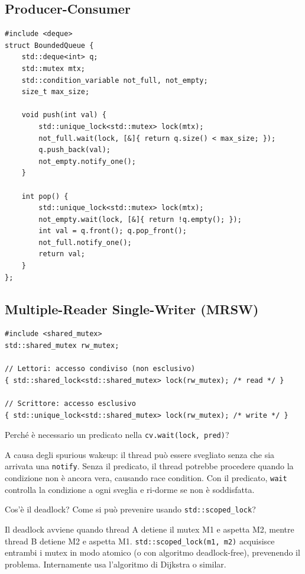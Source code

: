 \documentclass[11pt,a4paper]{article}
\theoremstyle{remark}
\newenvironment{esercizio}[1][]{%
  \begin{tcolorbox}[breakable,title={\textbf{Esercizio / Domanda d'esame}\ifx&#1&\else: #1\fi},
    colback=yellow!5!white, colframe=orange!75!black, fonttitle=\small\bfseries]%
}{%
  \end{tcolorbox}%
}
\newenvironment{risposta}{%
  \begin{tcolorbox}[breakable,title={\textbf{Risposta}},
    colback=green!5!white, colframe=green!50!black, fonttitle=\small\bfseries]%
}{%
  \end{tcolorbox}%
}
\begin{document}
\subsection{Producer-Consumer}

\begin{lstlisting}
#include <deque>
struct BoundedQueue {
    std::deque<int> q;
    std::mutex mtx;
    std::condition_variable not_full, not_empty;
    size_t max_size;

    void push(int val) {
        std::unique_lock<std::mutex> lock(mtx);
        not_full.wait(lock, [&]{ return q.size() < max_size; });
        q.push_back(val);
        not_empty.notify_one();
    }

    int pop() {
        std::unique_lock<std::mutex> lock(mtx);
        not_empty.wait(lock, [&]{ return !q.empty(); });
        int val = q.front(); q.pop_front();
        not_full.notify_one();
        return val;
    }
};
\end{lstlisting}

\subsection{Multiple-Reader Single-Writer (MRSW)}

\begin{lstlisting}
#include <shared_mutex>
std::shared_mutex rw_mutex;

// Lettori: accesso condiviso (non esclusivo)
{ std::shared_lock<std::shared_mutex> lock(rw_mutex); /* read */ }

// Scrittore: accesso esclusivo
{ std::unique_lock<std::shared_mutex> lock(rw_mutex); /* write */ }
\end{lstlisting}

\begin{esercizio}
Perché è necessario un predicato nella \texttt{cv.wait(lock, pred)}?
\end{esercizio}
\begin{risposta}
A causa degli spurious wakeup: il thread può essere svegliato senza che sia arrivata una \texttt{notify}. Senza il predicato, il thread potrebbe procedere quando la condizione non è ancora vera, causando race condition. Con il predicato, \texttt{wait} controlla la condizione a ogni sveglia e ri-dorme se non è soddisfatta.
\end{risposta}

\begin{esercizio}
Cos'è il deadlock? Come si può prevenire usando \texttt{std::scoped\_lock}?
\end{esercizio}
\begin{risposta}
Il deadlock avviene quando thread A detiene il mutex M1 e aspetta M2, mentre thread B detiene M2 e aspetta M1. \texttt{std::scoped\_lock(m1, m2)} acquisisce entrambi i mutex in modo atomico (o con algoritmo deadlock-free), prevenendo il problema. Internamente usa l'algoritmo di Dijkstra o similar.
\end{risposta}
\end{document}
